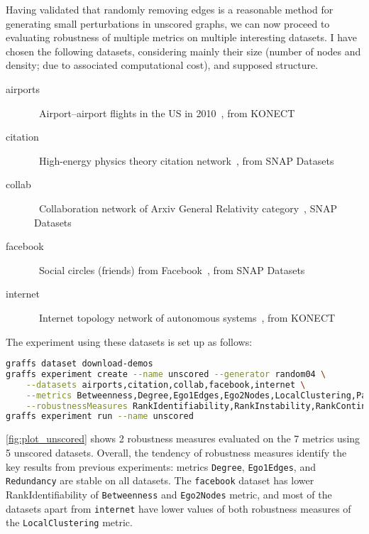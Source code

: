 Having validated that randomly removing edges is a reasonable method for generating small perturbations in unscored graphs, we can now proceed to evaluating robustness of multiple metrics on multiple interesting datasets.
I have chosen the following datasets, considering mainly their size (number of nodes and density; due to associated computational cost), and supposed structure.

\begin{description}
    \item[airports]\ Airport–airport flights in the US in 2010~\cite{konect:2016:opsahl-usairport,konect:opsahl11}, from KONECT~\cite{Kunegis2013}
    \item[citation]\ High-energy physics theory citation network~\cite{LeskovecGraphsTimeDensification2005,GehrkeOverview2003KDD2003}, from SNAP Datasets~\cite{Large2016}
    \item[collab]\ Collaboration network of Arxiv General Relativity category~\cite{LeskovecGraphEvolutionDensification2007}, SNAP Datasets
    \item[facebook]\ Social circles (friends) from Facebook~\cite{NIPS2012_4532}, from SNAP Datasets
    \item[internet]\ Internet topology network of autonomous systems~\cite{konect:zhang05,konect:2016:topology}, from KONECT
\end{description}



The experiment using these datasets is set up as follows:
\begin{lstlisting}[language=bash]
graffs dataset download-demos
graffs experiment create --name unscored --generator random04 \
    --datasets airports,citation,collab,facebook,internet \
    --metrics Betweenness,Degree,Ego1Edges,Ego2Nodes,LocalClustering,PageRank,Redundancy \
    --robustnessMeasures RankIdentifiability,RankInstability,RankContinuity
graffs experiment run --name unscored
\end{lstlisting}



\autoref{fig:plot_unscored} shows 2 robustness measures evaluated on the 7 metrics using 5 unscored datasets.
Overall, the tendency of robustness measures identify the key results from previous experiments: metrics \texttt{Degree}, \texttt{Ego1Edges}, and \texttt{Redundancy} are stable on all datasets.
The \texttt{facebook} dataset has lower RankIdentifiability of \texttt{Betweenness} and \texttt{Ego2Nodes} metric, and most of the datasets apart from \texttt{internet} have lower values of both robustness measures of the \texttt{LocalClustering} metric.


